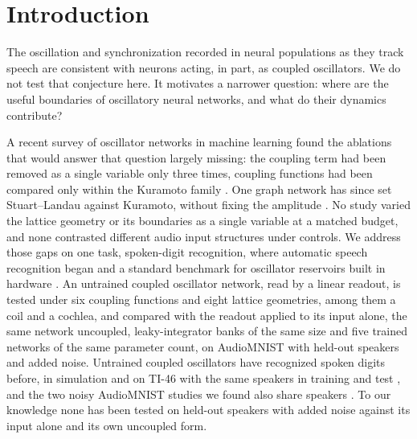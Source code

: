 \documentclass{article}
\makeatletter
\newcommand{\iclr@floatbarrier}{\par\vspace{\z@}%
  \ifx\@deferlist\@empty\else\clearpage\fi}
\let\iclr@section\section
\renewcommand{\section}{\iclr@floatbarrier\iclr@section}
\makeatother
\begin{document}
\section{Introduction}\label{sec-1}

The oscillation and synchronization recorded in neural populations as
they track speech
\citep{assaneo2020, doelling2023, pittman-polletta2021, dogonasheva2026}
are consistent with neurons acting, in part, as coupled oscillators. We
do not test that conjecture here. It motivates a narrower question:
where are the useful boundaries of oscillatory neural networks, and what
do their dynamics contribute?

A recent survey of oscillator networks in machine learning
\citep{kryski2026} found the ablations that would answer that question
largely missing: the coupling term had been removed as a single variable
only three times, coupling functions had been compared only within the
Kuramoto family \citep{nunley2026}. One graph network has since set
Stuart--Landau against Kuramoto, without fixing the amplitude
\citep{zhang2026}. No study varied the lattice geometry or its
boundaries as a single variable at a matched budget, and none contrasted
different audio input structures under controls. We address those gaps
on one task, spoken-digit recognition, where automatic speech
recognition began \citep{davis1952} and a standard benchmark for
oscillator reservoirs built in hardware
\citep{torrejon2017, shougat2023}. An untrained coupled oscillator
network, read by a linear readout, is tested under six coupling
functions and eight lattice geometries, among them a coil and a cochlea,
and compared with the readout applied to its input alone, the same
network uncoupled, leaky-integrator banks of the same size and five
trained networks of the same parameter count, on AudioMNIST
\citep{becker2024} with held-out speakers and added noise. Untrained
coupled oscillators have recognized spoken digits before, in simulation
and on TI-46 with the same speakers in training and test
\citep{opala2019, coulombe2017}, and the two noisy AudioMNIST studies we
found also share speakers \citep{beoletto2026, young2026}. To our
knowledge none has been tested on held-out speakers with added noise
against its input alone and its own uncoupled form.
\end{document}
